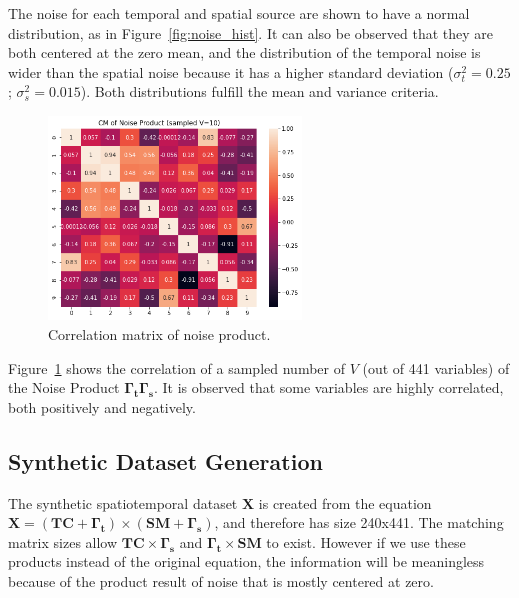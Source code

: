 \documentclass[11pt]{article}
\begin{document}
The noise for each temporal and spatial source are shown to have a normal distribution, as in Figure~\ref{fig:noise_hist}. It can also be observed that they are both centered at the zero mean, and the distribution of the temporal noise is wider than the spatial noise because it has a higher standard deviation ($\sigma^2_t = 0.25$; $\sigma^2_s = 0.015$). Both distributions fulfill the mean and variance criteria.

    \begin{figure}[H]
        \begin{center}
           \includegraphics[width=0.6\textwidth]{../plots/1_4_noise_product_CM}
          \caption{Correlation matrix of noise product.}
          \label{fig:noiseprod_cm}
        \end{center}
      \end{figure}

Figure~\ref{fig:noiseprod_cm} shows the correlation of a sampled number of $V$ (out of 441 variables) of the Noise Product $\mathbf{\Gamma_t \Gamma_s}$. It is observed that some variables are highly correlated, both positively and negatively. 

\subsection{Synthetic Dataset Generation}

The synthetic spatiotemporal dataset $\mathbf{X}$ is created from the equation $\mathbf{X} = (\mathbf{TC} + \mathbf{\Gamma_t}) \times (\mathbf{SM} + \mathbf{\Gamma_s})$, and therefore has size 240x441. The matching matrix sizes allow $\mathbf{TC} \times \mathbf{\Gamma_s}$ and $\mathbf{\Gamma_t} \times \mathbf{SM}$ to exist. However if we use these products instead of the original equation, the information will be meaningless because of the product result of noise that is mostly centered at zero.
\end{document}

